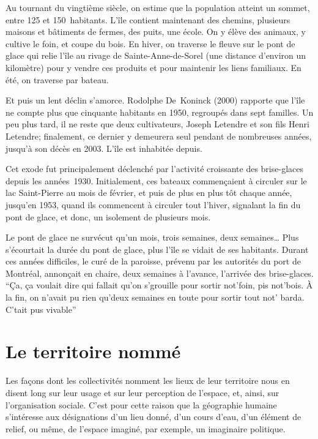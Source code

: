 \documentclass[12pt]{article}
\begin{document}
Au tournant du vingtième siècle, on estime que la population atteint un sommet, entre 125 et 150 habitants. L'île contient maintenant des chemins, plusieurs maisons et bâtiments de fermes, des puits, une école. On y élève des animaux, y cultive le foin, et coupe du bois. En hiver, on traverse le fleuve sur le pont de glace qui relie l'île au rivage de Sainte-Anne-de-Sorel (une distance d'environ un kilomètre) pour y vendre ces produits et pour maintenir les liens familiaux. En été, on traverse par bateau.  

Et puis un lent déclin s'amorce. Rodolphe De Koninck (2000) rapporte que l'île ne compte plus que cinquante habitants en 1950, regroupés dans sept familles. Un peu plus tard, il ne reste que deux cultivateurs, Joseph Letendre et son fils Henri Letendre; finalement, ce dernier y demeurera seul pendant de nombreuses années, jusqu'à son décès en 2003. L'île est inhabitée depuis.  


Cet exode fut principalement déclenché par l'activité croissante des brise-glaces depuis les années 1930. Initialement, ces bateaux commençaient à circuler sur le lac Saint-Pierre au mois de février, et puis de plus en plus tôt chaque année, jusqu'en 1953, quand ils commencent à circuler tout l'hiver, signalant la fin du pont de glace, et donc, un isolement de plusieurs mois.  

 \begin{textquote}
Le pont de glace ne survécut qu'un mois, trois semaines, deux semaines… Plus s'écourtait la durée du pont de glace, plus l'île se vidait de ses habitants. Durant ces années difficiles, le curé de la paroisse, prévenu par les autorités du port de Montréal, annonçait en chaire, deux semaines à l'avance, l'arrivée des brise-glaces. “Ça, ça voulait dire qui fallait qu'on s'grouille pour sortir not'foin, pis not'bois. À la fin, on n'avait pu rien qu'deux semaines en toute pour sortir tout not' barda. C'tait pus vivable”
\end{textquote}



\section*{Le territoire nommé}

Les façons dont les collectivités nomment les lieux de leur territoire nous en disent long sur leur usage et sur leur perception de l'espace, et, ainsi, sur l'organisation sociale. C'est pour cette raison que la géographie humaine s'intéresse aux désignations d'un lieu donné, d'un cours d'eau, d'un élément de relief, ou même, de l'espace imaginé, par exemple, un imaginaire politique.  
\end{document}
